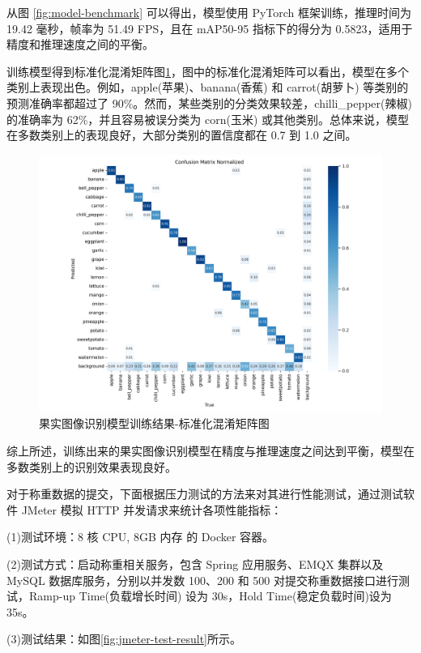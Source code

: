从图 \ref{fig:model-benchmark} 可以得出，模型使用 PyTorch 框架训练，推理时间为 19.42 毫秒，帧率为 51.49 FPS，且在 mAP50-95 指标下的得分为 0.5823，适用于精度和推理速度之间的平衡。

训练模型得到标准化混淆矩阵图\ref{fig:confusion_matrix_normalized}，图中的标准化混淆矩阵可以看出，模型在多个类别上表现出色。例如，apple(苹果)、banana(香蕉) 和 carrot(胡萝卜) 等类别的预测准确率都超过了 90\%。然而，某些类别的分类效果较差，chilli\_pepper(辣椒)的准确率为 62\%，并且容易被误分类为 corn(玉米) 或其他类别。总体来说，模型在多数类别上的表现良好，大部分类别的置信度都在 0.7 到 1.0 之间。

\begin{figure}
    \centering
    \includegraphics[width=0.95\linewidth]{../source/aws-img/yolov8/out/image/confusion_matrix_normalized.png}
    \caption{果实图像识别模型训练结果-标准化混淆矩阵图}
    \label{fig:confusion_matrix_normalized}
\end{figure}

综上所述，训练出来的果实图像识别模型在精度与推理速度之间达到平衡，模型在多数类别上的识别效果表现良好。

对于称重数据的提交，下面根据压力测试的方法\cite{Zhu2017}来对其进行性能测试，通过测试软件 JMeter 模拟 HTTP 并发请求来统计各项性能指标：

(1)测试环境：8 核 CPU, 8GB 内存 的 Docker 容器。

(2)测试方式：启动称重相关服务，包含 Spring 应用服务、EMQX 集群以及MySQL 数据库服务，分别以并发数 100、200 和 500 对提交称重数据接口进行测试，Ramp-up Time(负载增长时间) 设为 30s，Hold Time(稳定负载时间)设为 35s。

(3)测试结果：如图\ref{fig:jmeter-test-result}所示。

